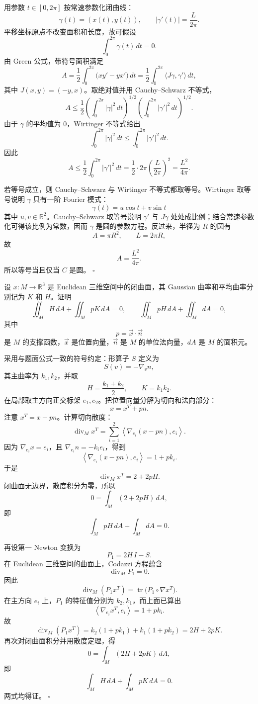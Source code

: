 \documentclass[UTF8,12pt]{ctexart}
\newcommand{\R}{\mathbb R}
\newcounter{problem}
\newenvironment{problem}[1][]{%
  \refstepcounter{problem}
  \par\bigskip
  \noindent{\large\bfseries 题目 \theproblem\if\relax\detokenize{#1}\relax\else\quad #1\fi}\par
  \smallskip
  \noindent\ignorespaces
}{\par}
\newenvironment{solution}{%
  \par\medskip
  \noindent{\bfseries 解答}\quad\ignorespaces
}{\hfill$\square$\par\medskip}
\begin{document}
\begin{solution}
用参数 \(t\in[0,2\pi]\) 按常速参数化闭曲线：
\[
\gamma(t)=(x(t),y(t)),\qquad |\gamma'(t)|=\frac{L}{2\pi}.
\]
平移坐标原点不改变面积和长度，故可假设
\[
\int_0^{2\pi}\gamma(t)\,dt=0.
\]
由 Green 公式，带符号面积满足
\[
A=\frac12\int_0^{2\pi}\bigl(xy'-yx'\bigr)\,dt
=\frac12\int_0^{2\pi}\langle J\gamma,\gamma'\rangle\,dt,
\]
其中 \(J(x,y)=(-y,x)\)。取绝对值并用 Cauchy--Schwarz 不等式，
\[
A\le \frac12
\left(\int_0^{2\pi}|\gamma|^2\,dt\right)^{1/2}
\left(\int_0^{2\pi}|\gamma'|^2\,dt\right)^{1/2}.
\]
由于 \(\gamma\) 的平均值为 \(0\)，Wirtinger 不等式给出
\[
\int_0^{2\pi}|\gamma|^2\,dt
\le
\int_0^{2\pi}|\gamma'|^2\,dt.
\]
因此
\[
A\le \frac12\int_0^{2\pi}|\gamma'|^2\,dt
=\frac12\cdot 2\pi\left(\frac{L}{2\pi}\right)^2
=\frac{L^2}{4\pi}.
\]

若等号成立，则 Cauchy--Schwarz 与 Wirtinger 不等式都取等号。Wirtinger 取等号说明 \(\gamma\) 只有一阶 Fourier 模式：
\[
\gamma(t)=u\cos t+v\sin t
\]
其中 \(u,v\in\R^2\)。Cauchy--Schwarz 取等号说明 \(\gamma'\) 与 \(J\gamma\) 处处成比例；结合常速参数化可得该比例为常数，因而 \(\gamma\) 是圆的参数方程。反过来，半径为 \(R\) 的圆有
\[
A=\pi R^2,\qquad L=2\pi R,
\]
故
\[
A=\frac{L^2}{4\pi}.
\]
所以等号当且仅当 \(C\) 是圆。
\end{solution}

\begin{problem}
设 \(x:M\to\R^3\) 是 Euclidean 三维空间中的闭曲面，其 Gaussian 曲率和平均曲率分别记为 \(K\) 和 \(H\)。证明
\[
\iint_M H\,dA+\iint_M pK\,dA=0,
\qquad
\iint_M pH\,dA+\iint_M dA=0,
\]
其中
\[
p=\vec x\cdot \vec n
\]
是 \(M\) 的支撑函数，\(\vec x\) 是位置向量，\(\vec n\) 是 \(M\) 的单位法向量，\(dA\) 是 \(M\) 的面积元。
\end{problem}

\begin{solution}
采用与题面公式一致的符号约定：形算子 \(S\) 定义为
\[
S(v)=-\nabla_v n,
\]
其主曲率为 \(k_1,k_2\)，并取
\[
H=\frac{k_1+k_2}{2},\qquad K=k_1k_2.
\]
在局部取主方向正交标架 \(e_1,e_2\)。把位置向量分解为切向和法向部分：
\[
x=x^T+p n.
\]
注意 \(x^T=x-pn\)。计算切向散度：
\[
\operatorname{div}_M x^T
=\sum_{i=1}^2\left\langle \nabla_{e_i}(x-pn),e_i\right\rangle.
\]
因为 \(\nabla_{e_i}x=e_i\)，且 \(\nabla_{e_i}n=-k_i e_i\)，得到
\[
\left\langle \nabla_{e_i}(x-pn),e_i\right\rangle
=1+p k_i.
\]
于是
\[
\operatorname{div}_M x^T=2+2pH.
\]
闭曲面无边界，散度积分为零，所以
\[
0=\int_M(2+2pH)\,dA,
\]
即
\[
\int_M pH\,dA+\int_M dA=0.
\]

再设第一 Newton 变换为
\[
P_1=2H\,I-S.
\]
在 Euclidean 三维空间的曲面上，Codazzi 方程蕴含
\[
\operatorname{div}_M P_1=0.
\]
因此
\[
\operatorname{div}_M(P_1x^T)
=\operatorname{tr}\bigl(P_1\circ\nabla x^T\bigr).
\]
在主方向 \(e_i\) 上，\(P_1\) 的特征值分别为 \(k_2,k_1\)，而上面已算出
\[
\left\langle \nabla_{e_i}x^T,e_i\right\rangle=1+p k_i.
\]
故
\[
\operatorname{div}_M(P_1x^T)
=k_2(1+pk_1)+k_1(1+pk_2)
=2H+2pK.
\]
再次对闭曲面积分并用散度定理，得
\[
0=\int_M(2H+2pK)\,dA,
\]
即
\[
\int_M H\,dA+\int_M pK\,dA=0.
\]
两式均得证。
\end{solution}
\end{document}
